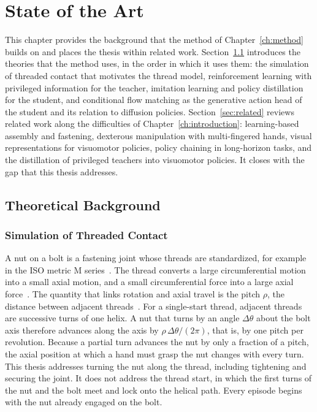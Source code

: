 \chapter{State of the Art}\label{ch:sota}%

This chapter provides the background that the method of Chapter~\ref{ch:method} builds on and places the thesis within related work. Section~\ref{sec:theory} introduces the theories that the method uses, in the order in which it uses them: the simulation of threaded contact that motivates the thread model, reinforcement learning with privileged information for the teacher, imitation learning and policy distillation for the student, and conditional flow matching as the generative action head of the student and its relation to diffusion policies. Section~\ref{sec:related} reviews related work along the difficulties of Chapter~\ref{ch:introduction}: learning-based assembly and fastening, dexterous manipulation with multi-fingered hands, visual representations for visuomotor policies, policy chaining in long-horizon tasks, and the distillation of privileged teachers into visuomotor policies. It closes with the gap that this thesis addresses.

\section{Theoretical Background}\label{sec:theory}

\subsection{Simulation of Threaded Contact}\label{sec:thread-background}

A nut on a bolt is a fastening joint whose threads are standardized, for example in the ISO metric M series~\cite{Budynas2020,Niemann2019}. The thread converts a large circumferential motion into a small axial motion, and a small circumferential force into a large axial force~\cite{Niemann2019}. The quantity that links rotation and axial travel is the pitch $\rho$, the distance between adjacent threads~\cite{Budynas2020}. For a single-start thread, adjacent threads are successive turns of one helix. A nut that turns by an angle $\Delta\theta$ about the bolt axis therefore advances along the axis by $\rho\,\Delta\theta/(2\pi)$, that is, by one pitch per revolution.
Because a partial turn advances the nut by only a fraction of a pitch, the axial position at which a hand must grasp the nut changes with every turn. This thesis addresses turning the nut along the thread, including tightening and securing the joint. It does not address the thread start, in which the first turns of the nut and the bolt meet and lock onto the helical path. Every episode begins with the nut already engaged on the bolt.

